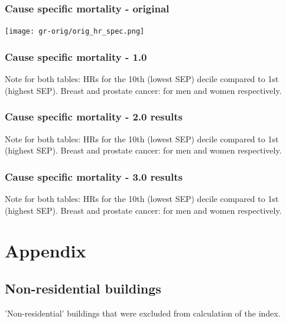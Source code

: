 \documentclass[a4paper, notitlepage, fleqn]{article} %
\begin{document}
\subsubsection{Cause specific mortality - original}

\begin{center}
\texttt{[image: gr-orig/orig\_hr\_spec.png]} 
\end{center}

\newpage
\subsubsection{Cause specific mortality - 1.0}
\begin{stlog}\end{stlog}
Note for both tables: HRs for the 10th (lowest SEP) decile compared to 1st (highest SEP). 
Breast and prostate cancer: for men and women respectively. 

\newpage
\subsubsection{Cause specific mortality - 2.0 results}
\begin{stlog}\end{stlog}
Note for both tables: HRs for the 10th (lowest SEP) decile compared to 1st (highest SEP). 
Breast and prostate cancer: for men and women respectively. 

\newpage
\subsubsection{Cause specific mortality - 3.0 results}
\begin{stlog}\end{stlog}
Note for both tables: HRs for the 10th (lowest SEP) decile compared to 1st (highest SEP). 
Breast and prostate cancer: for men and women respectively. 
\newpage
\section{Appendix}

\subsection{Non-residential buildings}

'Non-residential' buildings that were excluded from calculation of the index.
\begin{stlog}\end{stlog}
\end{document}
